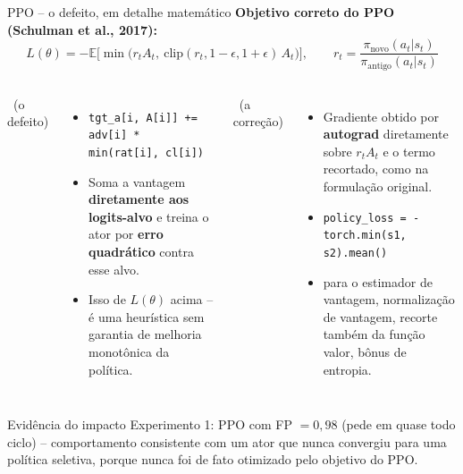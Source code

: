 \begin{frame}{PPO -- o defeito, em detalhe matemático}
  \footnotesize
  \textbf{Objetivo correto do PPO (Schulman et al., 2017):}
  \[
    L(\theta) = -\mathbb{E}\Big[\min\big(r_t A_t,\ \mathrm{clip}(r_t, 1{-}\epsilon, 1{+}\epsilon)\,A_t\big)\Big],
    \qquad r_t = \frac{\pi_{\text{novo}}(a_t|s_t)}{\pi_{\text{antigo}}(a_t|s_t)}
  \]
  \vspace{0.3em}

  \begin{columns}[T,onlytextwidth]
      \antes\ (o defeito)
      \begin{itemize}\footnotesize
        \item \texttt{tgt\_a[i, A[i]] += adv[i] * min(rat[i], cl[i])}
        \item Soma a vantagem \textbf{diretamente aos logits-alvo} e treina
          o ator por \textbf{erro quadrático} contra esse alvo.
        \item Isso  de $L(\theta)$ acima --
          é uma heurística sem garantia de melhoria monotônica da política.
      \end{itemize}
      \depois\ (a correção)
      \begin{itemize}\footnotesize
        \item Gradiente obtido por \textbf{autograd} diretamente sobre
          $r_t A_t$ e o termo recortado, como na formulação original.
        \item \texttt{policy\_loss = -torch.min(s1, s2).mean()}
        \item {} para o estimador de
          vantagem, normalização de vantagem, recorte também da função
          valor, bônus de entropia.
      \end{itemize}
  \end{columns}
  \vspace{0.6em}

  \begin{alertblock}{Evidência do impacto}
    \small Experimento 1: PPO com FP $=0{,}98$ (pede em quase todo ciclo)
    -- comportamento consistente com um ator que nunca convergiu para uma
    política seletiva, porque nunca foi de fato otimizado pelo objetivo
    do PPO.
  \end{alertblock}


\end{frame}
